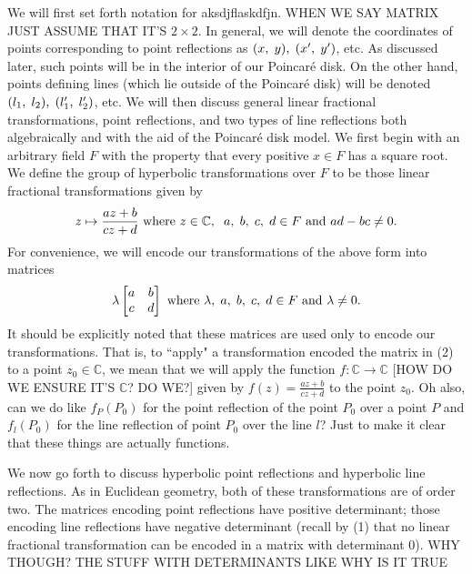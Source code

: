 \documentclass[12pt]{article}
\newcommand{\C}{\mathbb{C}}
\newcommand{\poincare}{Poincar\'{e} }
\newcommand{\ttc}{, \hspace{1mm}}
\newcommand{\lftmat}[4]{\begin{bmatrix} {#1} & {#2} \\ {#3} & {#4} \end{bmatrix}}
\newcommand{\stanlftmat}{\lftmat{a}{b}{c}{d}}
\begin{document}
We will first set forth notation for aksdjflaskdfjn. WHEN WE SAY MATRIX JUST ASSUME THAT IT'S $2 \times 2$. In general, we will denote the coordinates of points corresponding to point reflections as $(x \ttc y) \ttc (x' \ttc y')$, etc. As discussed later, such points will be in the interior of our \poincare disk. On the other hand, points defining lines (which lie outside of the \poincare disk) will be denoted $(l_1 \ttc l_2) \ttc (l_1' \ttc l_2')$, etc. We will then discuss general linear fractional transformations, point reflections, and two types of line reflections both algebraically and with the aid of the \poincare disk model. We first begin with an arbitrary field $F$ with the property that every positive $x \in F$ has a square root. We define the group of hyperbolic transformations over $F$ to be those linear fractional transformations given by
\begin{equation} 
z \mapsto \frac{az+b}{cz+d} \text{ where } z \in \C, \hspace{2mm} a \ttc b \ttc c \ttc d \in F \text{ and } ad-bc \neq 0. 
\end{equation}
For convenience, we will encode our transformations of the above form into matrices 
\begin{equation} 
\lambda \stanlftmat \text{ where } \lambda \ttc a \ttc b \ttc c \ttc d \in F \text{ and } \lambda \neq 0. 
\end{equation}
It should be explicitly noted that these matrices are used only to encode our transformations. That is, to ``apply" a transformation encoded the matrix in (2) to a point $z_0 \in \C$, we mean that we will apply the function $f: \C \rightarrow \C$ [HOW DO WE ENSURE IT'S $\C$? DO WE?] given by $f(z) = \frac{az+b}{cz+d}$ to the point $z_0$. Oh also, can we do like $f_P(P_0)$ for the point reflection of the point $P_0$ over a point $P$ and $f_l(P_0)$ for the line reflection of point $P_0$ over the line $l$? Just to make it clear that these things are actually functions.
	
We now go forth to discuss hyperbolic point reflections and hyperbolic line reflections. As in Euclidean geometry, both of these transformations are of order two. The matrices encoding point reflections have positive determinant; those encoding line reflections have negative determinant (recall by (1) that no linear fractional transformation can be encoded in a matrix with determinant 0). WHY THOUGH? THE STUFF WITH DETERMINANTS LIKE WHY IS IT TRUE
\end{document}
